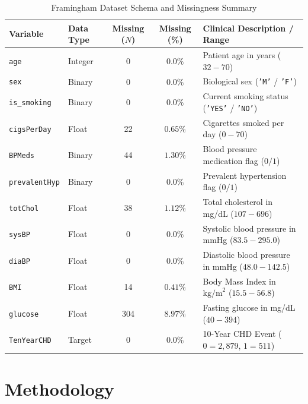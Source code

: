\documentclass[manuscript, screen, review]{jair}
\begin{document}
\begin{table}[ht]
  \caption{Framingham Dataset Schema and Missingness Summary}
  \label{tab:schema}
  \centering
  \begin{tabular}{@{}llccl@{}}
    \toprule
    Variable & Data Type & Missing ($N$) & Missing (\%) & Clinical Description / Range \\
    \midrule
    \texttt{age} & Integer & 0 & $0.0\%$ & Patient age in years ($32 - 70$) \\
    \texttt{sex} & Binary & 0 & $0.0\%$ & Biological sex (\texttt{'M'} / \texttt{'F'}) \\
    \texttt{is\_smoking} & Binary & 0 & $0.0\%$ & Current smoking status (\texttt{'YES'} / \texttt{'NO'}) \\
    \texttt{cigsPerDay} & Float & 22 & $0.65\%$ & Cigarettes smoked per day ($0 - 70$) \\
    \texttt{BPMeds} & Binary & 44 & $1.30\%$ & Blood pressure medication flag ($0 / 1$) \\
    \texttt{prevalentHyp} & Binary & 0 & $0.0\%$ & Prevalent hypertension flag ($0 / 1$) \\
    \texttt{totChol} & Float & 38 & $1.12\%$ & Total cholesterol in mg/dL ($107 - 696$) \\
    \texttt{sysBP} & Float & 0 & $0.0\%$ & Systolic blood pressure in mmHg ($83.5 - 295.0$) \\
    \texttt{diaBP} & Float & 0 & $0.0\%$ & Diastolic blood pressure in mmHg ($48.0 - 142.5$) \\
    \texttt{BMI} & Float & 14 & $0.41\%$ & Body Mass Index in $\text{kg/m}^2$ ($15.5 - 56.8$) \\
    \texttt{glucose} & Float & 304 & $8.97\%$ & Fasting glucose in mg/dL ($40 - 394$) \\
    \texttt{TenYearCHD} & Target & 0 & $0.0\%$ & 10-Year CHD Event ($0 = 2,879$, $1 = 511$) \\
    \bottomrule
  \end{tabular}
\end{table}

\section{Methodology}
\end{document}
